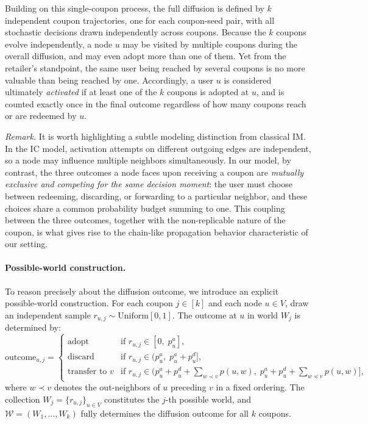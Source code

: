\documentclass[sigconf]{acmart}
\begin{document}
Building on this single-coupon process, the full diffusion is defined by $k$ independent coupon trajectories, one for each coupon-seed pair, with all stochastic decisions drawn independently across coupons. Because the $k$ coupons evolve independently, a node $u$ may be visited by multiple coupons during the overall diffusion, and may even adopt more than one of them. Yet from the retailer's standpoint, the same user being reached by several coupons is no more valuable than being reached by one. Accordingly, a user $u$ is considered ultimately \emph{activated} if at least one of the $k$ coupons is adopted at $u$, and is counted exactly once in the final outcome regardless of how many coupons reach or are redeemed by $u$.

\textit{Remark.} It is worth highlighting a subtle modeling distinction from classical IM. In the IC model, activation attempts on different outgoing edges are independent, so a node may influence multiple neighbors simultaneously. In our model, by contrast, the three outcomes a node faces upon receiving a coupon are \emph{mutually exclusive and competing for the same decision moment}: the user must choose between redeeming, discarding, or forwarding to a particular neighbor, and these choices share a common probability budget summing to one. This coupling between the three outcomes, together with the non-replicable nature of the coupon, is what gives rise to the chain-like propagation behavior characteristic of our setting.

\paragraph{Possible-world construction.}
To reason precisely about the diffusion outcome, we introduce an explicit possible-world construction. For each coupon $j \in [k]$ and each node $u \in V$, draw an independent sample $r_{u,j} \sim \mathrm{Uniform}[0,1]$. The outcome at $u$ in world $W_j$ is determined by:
\[
  \text{outcome}_{u,j} =
  \begin{cases}
    \text{adopt}   & \text{if } r_{u,j} \in [0,\; p_u^a], \\
    \text{discard} & \text{if } r_{u,j} \in (p_u^a,\; p_u^a + p_u^d], \\
    \text{transfer to } v & \text{if } r_{u,j} \in \bigl(p_u^a + p_u^d + \textstyle\sum_{w \prec v} p(u,w),\; p_u^a + p_u^d + \textstyle\sum_{w \preceq v} p(u,w)\bigr],
  \end{cases}
\]
where $w \prec v$ denotes the out-neighbors of $u$ preceding $v$ in a fixed ordering. The collection $W_j = \{r_{u,j}\}_{u \in V}$ constitutes the $j$-th possible world, and $\mathcal{W} = (W_1, \ldots, W_k)$ fully determines the diffusion outcome for all $k$ coupons.
\end{document}
